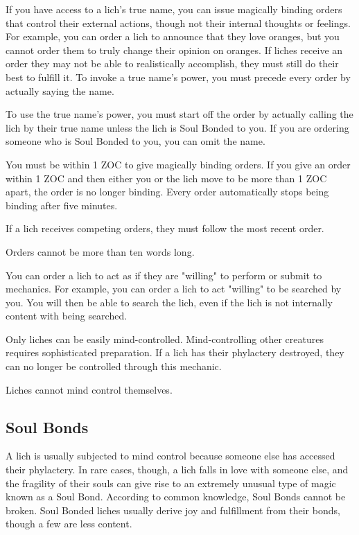 \documentclass[green]{Sel}
\begin{document}
\name{\gMindControl{}}
If you have access to a lich's true name, you can issue magically binding orders that control their external actions, though not their internal thoughts or feelings. For example, you can order a lich to announce that they love oranges, but you cannot order them to truly change their opinion on oranges. If liches receive an order they may not be able to realistically accomplish, they must still do their best to fulfill it. To invoke a true name's power, you must precede every order by actually saying the name.

To use the true name's power, you must start off the order by actually calling the lich by their true name unless the lich is Soul Bonded to you. If you are ordering someone who is Soul Bonded to you, you can omit the name.

You must be within 1 ZOC to give magically binding orders. If you give an order within 1 ZOC and then either you or the lich move to be more than 1 ZOC apart, the order is no longer binding. Every order automatically stops being binding after five minutes.

If a lich receives competing orders, they must follow the most recent order.

Orders cannot be more than ten words long.

You can order a lich to act as if they are "willing" to perform or submit to mechanics. For example,  you can order a lich to act "willing" to be searched by you. You will then be able to search the lich, even if the lich is not internally content with being searched.

Only liches can be easily mind-controlled. Mind-controlling other creatures requires sophisticated preparation. If a lich has their phylactery destroyed, they can no longer be controlled through this mechanic.

Liches cannot mind control themselves.


\subsection{Soul Bonds}

A lich is usually subjected to mind control because someone else has accessed their phylactery. In rare cases, though, a lich falls in love with someone else, and the fragility of their souls can give rise to an extremely unusual type of magic known as a Soul Bond. According to common knowledge, Soul Bonds cannot be broken. Soul Bonded liches usually derive joy and fulfillment from their bonds, though a few are less content.
\end{document}

